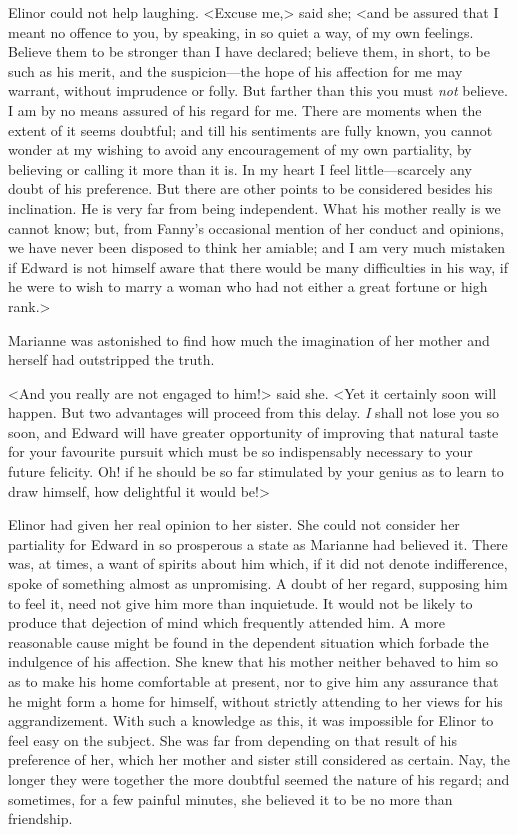 Elinor could not help laughing. <Excuse me,> said she; <and be assured that I meant no offence to you, by speaking, in so quiet a way, of my own feelings. Believe them to be stronger than I have declared; believe them, in short, to be such as his merit, and the suspicion—the hope of his affection for me may warrant, without imprudence or folly. But farther than this you must \textit{not} believe. I am by no means assured of his regard for me. There are moments when the extent of it seems doubtful; and till his sentiments are fully known, you cannot wonder at my wishing to avoid any encouragement of my own partiality, by believing or calling it more than it is. In my heart I feel little—scarcely any doubt of his preference. But there are other points to be considered besides his inclination. He is very far from being independent. What his mother really is we cannot know; but, from Fanny's occasional mention of her conduct and opinions, we have never been disposed to think her amiable; and I am very much mistaken if Edward is not himself aware that there would be many difficulties in his way, if he were to wish to marry a woman who had not either a great fortune or high rank.>

Marianne was astonished to find how much the imagination of her mother and herself had outstripped the truth.

<And you really are not engaged to him!> said she. <Yet it certainly soon will happen. But two advantages will proceed from this delay. \textit{I} shall not lose you so soon, and Edward will have greater opportunity of improving that natural taste for your favourite pursuit which must be so indispensably necessary to your future felicity. Oh! if he should be so far stimulated by your genius as to learn to draw himself, how delightful it would be!>

Elinor had given her real opinion to her sister. She could not consider her partiality for Edward in so prosperous a state as Marianne had believed it. There was, at times, a want of spirits about him which, if it did not denote indifference, spoke of something almost as unpromising. A doubt of her regard, supposing him to feel it, need not give him more than inquietude. It would not be likely to produce that dejection of mind which frequently attended him. A more reasonable cause might be found in the dependent situation which forbade the indulgence of his affection. She knew that his mother neither behaved to him so as to make his home comfortable at present, nor to give him any assurance that he might form a home for himself, without strictly attending to her views for his aggrandizement. With such a knowledge as this, it was impossible for Elinor to feel easy on the subject. She was far from depending on that result of his preference of her, which her mother and sister still considered as certain. Nay, the longer they were together the more doubtful seemed the nature of his regard; and sometimes, for a few painful minutes, she believed it to be no more than friendship.

